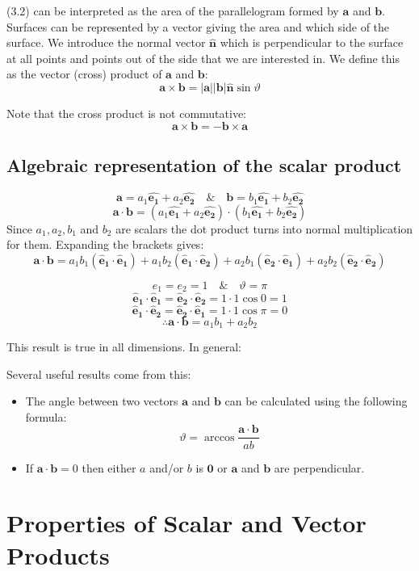 \documentclass{article}
\newcommand{\vh}[1]{\vec{\hat{#1}}}
\renewcommand{\vec}[1]{\bm{#1}}
\newcommand{\vv}[1]{\vec{#1}}
\newcommand{\ve}[1]{\vec{\hat{e}_{#1}}}
\begin{document}
(3.2) can be interpreted as the area of the parallelogram formed by \(\vv a\) and \(\vv b\). Surfaces can be represented by a vector giving the area and which side of the surface. We introduce the normal vector \(\vh n\) which is perpendicular to the surface at all points and points out of the side that we are interested in. We define this as the vector (cross) product of \(\vv a\) and \(\vv b\):
\[\vv a\times\vv b=|\vv a||\vv b|\vh n\sin\vartheta\]

Note that the cross product is not commutative:
\[\vv a\times\vv b=-\vv b\times\vv a\]

\subsection*{Algebraic representation of the scalar product}


\[\vv a=a_1\vh{e_1}+a_2\vh{e_2}\quad\&\quad\vv b=b_1\vh{e_1}+b_2\vh{e_2}\]
\[\vv a\cdot\vv b=(a_1\vh{e_1}+a_2\vh{e_2})\cdot(b_1\vh{e_1}+b_2\vh{e_2})\]
Since \(a_1, a_2, b_1\) and \(b_2\) are scalars the dot product turns into normal multiplication for them. Expanding the brackets gives:
\[\vv a\cdot\vv b=a_1b_1(\ve1\cdot\ve1)+a_1b_2(\ve1\cdot\ve2)+a_2b_1(\ve2\cdot\ve1)+a_2b_2(\ve2\cdot\ve2)\]

\[e_1=e_2=1 \quad\&\quad\vartheta=\pi\]
\[\ve1\cdot\ve1=\ve2\cdot\ve2=1\cdot1\cos0=1\]
\[\ve1\cdot\ve2=\ve2\cdot\ve1=1\cdot1\cos\pi=0\]
\[\therefore \vv a\cdot\vv b=a_1b_1+a_2b_2\]

This result is true in all dimensions. In general:

\begin{center}
\boxed{a_i\ve i\cdot b_i\ve i=a_ib_i=ab\cos\vartheta}
\end{center}

Several useful results come from this:
\begin{itemize}
\item The angle between two vectors \(\vv a\) and \(\vv b\) can be calculated using the following formula:
\[\vartheta=\arccos\frac{\vv a\cdot\vv b}{ab}\]
\item If \(\vv a\cdot\vv b=0\) then either \(a\) and/or \(b\) is \(\vv0\) or \(\vv a\) and \(\vv b\) are perpendicular. 
\end{itemize}

\section{Properties of Scalar and Vector Products}
\end{document}
